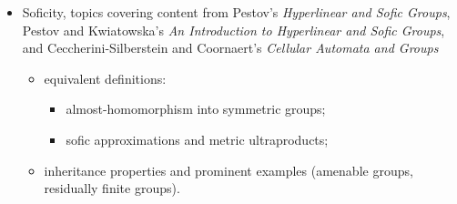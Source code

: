 \documentclass[10pt]{mypackage}
\begin{document}
\begin{itemize}
\begin{itemize}
\begin{itemize}
        \item existence of a net $\left( \varphi_i \right)_i$ of finitely supported positive definite functions on $\Gamma$ converging to $1$ pointwise;
        \item $C^{\ast}\left( \Gamma \right) = C^{\ast}_{\lambda}\left( \Gamma \right)$.
      \end{itemize}
    \end{itemize}
  \item Soficity, topics covering content from Pestov's \textit{Hyperlinear and Sofic Groups}, Pestov and Kwiatowska's \textit{An Introduction to Hyperlinear and Sofic Groups}, and Ceccherini-Silberstein and Coornaert's \textit{Cellular Automata and Groups}
    \begin{itemize}
      \item equivalent definitions:
        \begin{itemize}
          \item almost-homomorphism into symmetric groups;
          \item sofic approximations and metric ultraproducts;
        \end{itemize}
      \item inheritance properties and prominent examples (amenable groups, residually finite groups).
    \end{itemize}
\end{itemize}
\pagebreak
\nocite{*}
\printbibliography
\end{document}
